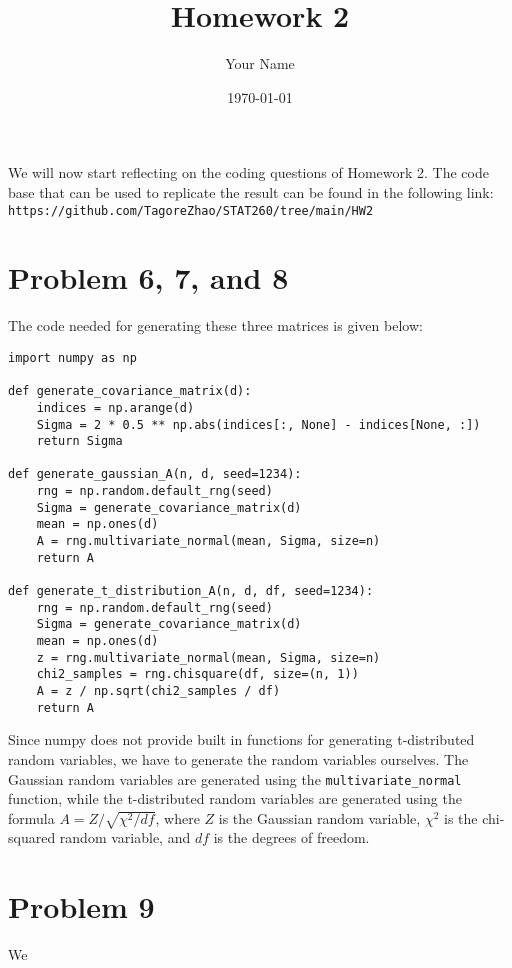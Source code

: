 \documentclass{article}
\title{Homework 2}
\author{Your Name}
\date{\today}
\begin{document}
\maketitle


We will now start reflecting on the coding questions of Homework 2. The code base that can be used to replicate the result can be found
in the following link: \texttt{https://github.com/TagoreZhao/STAT260/tree/main/HW2}

\section{Problem 6, 7, and 8}

The code needed for generating these three matrices is given below:

\begin{lstlisting}[caption={Python code for generating matrices}]
import numpy as np

def generate_covariance_matrix(d):
    indices = np.arange(d)
    Sigma = 2 * 0.5 ** np.abs(indices[:, None] - indices[None, :])
    return Sigma

def generate_gaussian_A(n, d, seed=1234):
    rng = np.random.default_rng(seed)
    Sigma = generate_covariance_matrix(d)
    mean = np.ones(d)
    A = rng.multivariate_normal(mean, Sigma, size=n)
    return A

def generate_t_distribution_A(n, d, df, seed=1234):
    rng = np.random.default_rng(seed)
    Sigma = generate_covariance_matrix(d)
    mean = np.ones(d)
    z = rng.multivariate_normal(mean, Sigma, size=n)
    chi2_samples = rng.chisquare(df, size=(n, 1))
    A = z / np.sqrt(chi2_samples / df)
    return A
\end{lstlisting}
Since numpy does not provide built in functions for generating t-distributed random variables, we have to generate the random variables
ourselves. The Gaussian random variables are generated using the \texttt{multivariate\_normal}
function, while the t-distributed random variables are generated using the formula $A = Z / \sqrt{\chi^2 / df}$, where $Z$ is the Gaussian
random variable, $\chi^2$ is the chi-squared random variable, and $df$ is the degrees of freedom.

\section*{Problem 9}
We 


\end{document}
